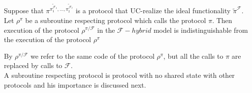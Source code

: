 \documentclass{acm_proc_article-sp}
\begin{document}
\begin{theorem}
Suppose that
$\pi^{
    \tilde{\pi_1^{\mathcal{F}_1}},
    \ldots,
    \tilde{\pi_t^{\mathcal{F}_t}}}$
is a protocol that UC-realize the ideal functionality $\tilde{\pi}^{\mathcal{F}}$. Let $\rho^\pi$
be a subroutine respecting protocol which calls the protocol $\pi$. Then execution of the protocol
$\rho^{\pi/\mathcal{F}}$ in
the $\mathcal{F}-hybrid$ model is indistinguishable from the execution of the protocol $\rho^\pi$
\end{theorem}

By $\rho^{\pi/\mathcal{F}}$ we refer to the same code of the protocol $\rho^\pi$, but all the calls to $\pi$
are replaced by calls to $\mathcal{F}$.\\
A subroutine respecting protocol is protocol with no shared state with other protocols and his importance
is discussed next.\\
\end{document}
